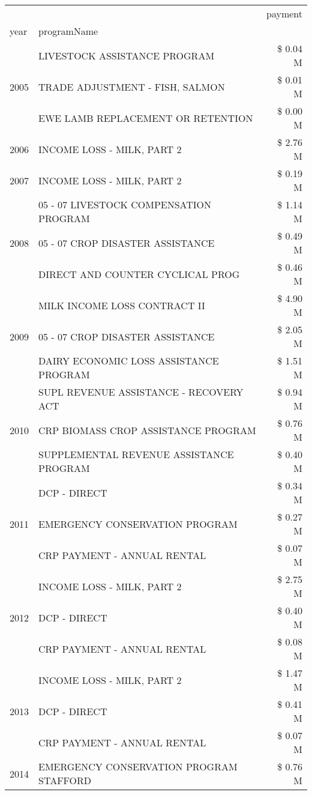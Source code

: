 \begin{tabular}{llr}
\toprule
 &  & payment \\
year & programName &  \\
\midrule
\multirow[t]{3}{*}{2005} & LIVESTOCK ASSISTANCE PROGRAM & \$ 0.04 M \\
 & TRADE ADJUSTMENT - FISH, SALMON & \$ 0.01 M \\
 & EWE LAMB REPLACEMENT OR RETENTION & \$ 0.00 M \\
\cline{1-3}
2006 & INCOME LOSS - MILK, PART 2 & \$ 2.76 M \\
\cline{1-3}
2007 & INCOME LOSS - MILK, PART 2 & \$ 0.19 M \\
\cline{1-3}
\multirow[t]{3}{*}{2008} & 05 - 07 LIVESTOCK COMPENSATION PROGRAM & \$ 1.14 M \\
 & 05 - 07 CROP DISASTER ASSISTANCE & \$ 0.49 M \\
 & DIRECT AND COUNTER CYCLICAL PROG & \$ 0.46 M \\
\cline{1-3}
\multirow[t]{3}{*}{2009} & MILK INCOME LOSS CONTRACT II & \$ 4.90 M \\
 & 05 - 07 CROP DISASTER ASSISTANCE & \$ 2.05 M \\
 & DAIRY ECONOMIC LOSS ASSISTANCE PROGRAM & \$ 1.51 M \\
\cline{1-3}
\multirow[t]{3}{*}{2010} & SUPL REVENUE ASSISTANCE - RECOVERY ACT & \$ 0.94 M \\
 & CRP BIOMASS CROP ASSISTANCE PROGRAM & \$ 0.76 M \\
 & SUPPLEMENTAL REVENUE ASSISTANCE PROGRAM & \$ 0.40 M \\
\cline{1-3}
\multirow[t]{3}{*}{2011} & DCP - DIRECT & \$ 0.34 M \\
 & EMERGENCY CONSERVATION PROGRAM & \$ 0.27 M \\
 & CRP PAYMENT - ANNUAL RENTAL & \$ 0.07 M \\
\cline{1-3}
\multirow[t]{3}{*}{2012} & INCOME LOSS - MILK, PART 2 & \$ 2.75 M \\
 & DCP - DIRECT & \$ 0.40 M \\
 & CRP PAYMENT - ANNUAL RENTAL & \$ 0.08 M \\
\cline{1-3}
\multirow[t]{3}{*}{2013} & INCOME LOSS - MILK, PART 2 & \$ 1.47 M \\
 & DCP - DIRECT & \$ 0.41 M \\
 & CRP PAYMENT - ANNUAL RENTAL & \$ 0.07 M \\
\cline{1-3}
\multirow[t]{3}{*}{2014} & EMERGENCY CONSERVATION PROGRAM STAFFORD & \$ 0.76 M \\

\end{tabular}
